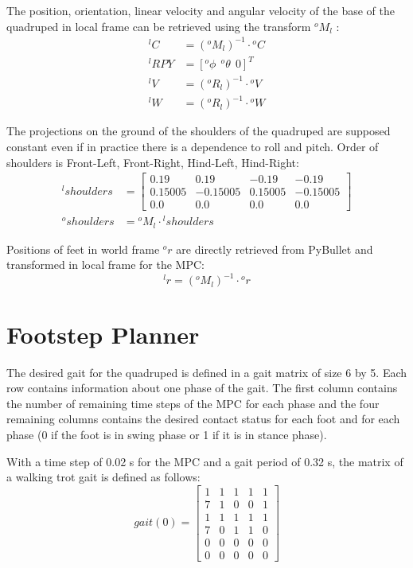 \documentclass[a4paper,11pt]{article}
\newcommand{\fM}[2]{{}^{#1}\!M_{#2}}
\begin{document}
The position, orientation, linear velocity and angular velocity of the base of the quadruped in local frame can be retrieved using the transform $\fM{o}{l}$ :
\begin{align}
{}^l\!C &= (\fM{o}{l})^{-1} \cdot {}^o\!C \\
{}^l\!RPY &= [{}^o\phi~~{}^o\theta~~0]^T \\
{}^l\!V &= ({}^o\!R_l)^{-1} \cdot {}^o\!V \\
{}^l\!W &= ({}^o\!R_l)^{-1} \cdot {}^o\!W
\end{align}

The projections on the ground of the shoulders of the quadruped are supposed constant even if in practice there is a dependence to roll and pitch. Order of shoulders is Front-Left, Front-Right, Hind-Left, Hind-Right:
\begin{align}
{}^l\!shoulders &= \begin{bmatrix} 0.19 & 0.19 & -0.19 & -0.19 \\ 0.15005 & -0.15005 & 0.15005 & -0.15005 \\ 0.0 & 0.0 & 0.0 & 0.0 \end{bmatrix} \\
{}^o\!shoulders &= \fM{o}{l} \cdot {}^l\!shoulders
\end{align}  

Positions of feet in world frame ${}^o\!r$ are directly retrieved from PyBullet and transformed in local frame for the MPC:
\begin{equation}
{}^l\!r = (\fM{o}{l})^{-1} \cdot {}^o\!r
\end{equation} 

\newpage
\section{Footstep Planner}

The desired gait for the quadruped is defined in a gait matrix of size 6 by 5. Each row contains information about one phase of the gait. The first column contains the number of remaining time steps of the MPC for each phase and the four remaining columns contains the desired contact status for each foot and for each phase (0 if the foot is in swing phase or 1 if it is in stance phase).

With a time step of 0.02 s for the MPC and a gait period of 0.32 s, the matrix of a walking trot gait is defined as follows:
\begin{equation}
gait(0) = \begin{bmatrix} 
1 & 1 & 1 & 1 & 1 \\
7 & 1 & 0 & 0 & 1 \\
1 & 1 & 1 & 1 & 1 \\
7 & 0 & 1 & 1 & 0 \\
0 & 0 & 0 & 0 & 0 \\
0 & 0 & 0 & 0 & 0 \end{bmatrix} \label{eq:gait0}
\end{equation}
\end{document}
